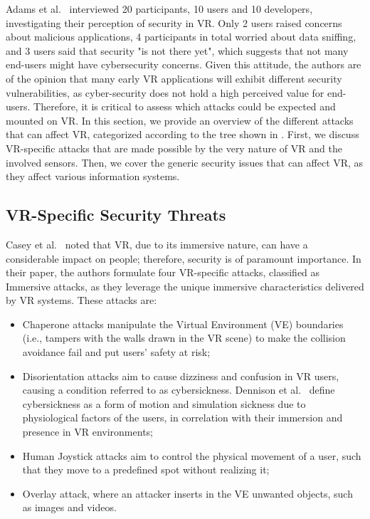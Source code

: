 \documentclass[journal]{IEEEtran}
\begin{document}
Adams et al.~\cite{adams2018} interviewed 20 participants, 10 users and 10 developers, investigating their perception of security in VR. Only 2 users raised concerns about malicious applications, 4 participants in total worried about data sniffing, and 3 users said that security "is not there yet", which suggests that not many end-users might have cybersecurity concerns. Given this attitude, the authors are of the opinion that many early VR applications will exhibit different security vulnerabilities, as cyber-security does not hold a high perceived value for end-users. Therefore, it is critical to assess which attacks could be expected and mounted on VR. In this section, we provide an overview of the different attacks that can affect VR, categorized according to the tree shown in . First, we discuss VR-specific attacks that are made possible by the very nature of VR and the involved sensors. Then, we cover the generic security issues that can affect VR, as they affect various information systems.






\subsection{VR-Specific Security Threats}
Casey et al.~\cite{casey2019} noted that VR, due to its immersive nature, can have a considerable impact on people; therefore, security is of paramount importance. In their paper, the authors formulate four VR-specific attacks, classified as Immersive attacks, as they leverage the unique immersive characteristics delivered by VR systems. These attacks are:
\begin{itemize}
    \item Chaperone attacks manipulate the Virtual Environment (VE) boundaries (i.e., tampers with the walls drawn in the VR scene) to make the collision avoidance fail and put users' safety at risk;
    \item Disorientation attacks aim to cause dizziness and confusion in VR users, causing a condition referred to as cybersickness. Dennison et al.~\cite{dennison2016} define cybersickness as a form of motion and simulation sickness due to physiological factors of the users, in correlation with their immersion and presence in VR environments;
    \item Human Joystick attacks aim to control the physical movement of a user, such that they move to a predefined spot without realizing it;
    \item Overlay attack, where an attacker inserts in the VE unwanted objects, such as images and videos. 
\end{itemize}
\end{document}

